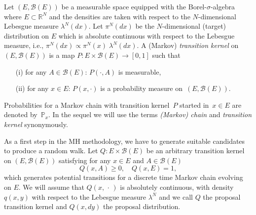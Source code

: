 Let $ \left( E, \mathcal{B}(E) \right) $ be a measurable space equipped with the Borel-$\sigma$-algebra where $ E \subset \mathbb{R}^{N} $ and the densities are taken with respect to the $N$-dimensional Lebesgue measure $\lambda^{N}(dx)$. Let $ \pi^{N}(dx) $ be the $N$-dimensional (target) distribution on $ E $ which is absolute continuous with respect to the Lebesgue measure, i.e., $ \pi^{N}(dx) \varpropto \pi^{N}(x) \; \lambda^{N}(dx) $. A (Markov) \textit{transition kernel} on~$\left( E, \mathcal{B}(E) \right) $ is a map $ P : E \times \mathcal{B}(E)  \to [0,1]$ such that
\begin{enumerate}
 \item[(i)] for any $A \in \mathcal{B}(E)$: $P(\cdot, A) $ is measurable,
 \item[(ii)] for any $ x \in E $: $P(x, \cdot)$ is a probability measure on~$\left( E, \mathcal{B}(E) \right) $.
\end{enumerate}
Probabilities for a Markov chain with transition kernel~$P$ started in~$x \in E$ are denoted by~$ \mathbb{P}_x $. In the sequel  we will use the terms \textit{(Markov) chain} and \textit{transition kernel} synonymously. 


As a first step in the MH methodology, we have to generate suitable candidates to produce a random walk. Let $ Q : E \times \mathcal{B}(E) $ be an arbitrary transition kernel on $\left( E, \mathcal{B}(E) \right) $ satisfying for any $ x \in E $ and $ A \in \mathcal{B}(E) $
\begin{equation}
\label{MH - proposal kernel}
 Q(x,A) \geq 0, \quad Q(x, E) = 1,
\end{equation}
which generates potential transitions for a discrete time Markov chain evolving on $ E $.  We will assume that $ Q(x, \, \cdot \,) $ is absolutely continuous, with density $ q(x,y) $  with respect to the Lebesgue measure $ \lambda^{N}$ and we call $Q$ the proposal transition kernel and $ Q(x,dy) $ the proposal distribution.



